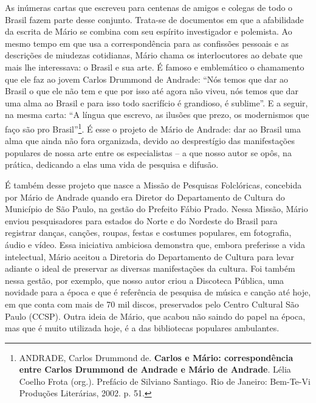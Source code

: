 \documentclass[11pt]{extarticle}
\begin{document}
As inúmeras cartas que escreveu para centenas de amigos e colegas de
todo o Brasil fazem parte desse conjunto. Trata-se de documentos em que
a afabilidade da escrita de Mário se combina com seu espírito
investigador e polemista. Ao mesmo tempo em que usa a correspondência
para as confissões pessoais e as descrições de miudezas cotidianas,
Mário chama os interlocutores ao debate que mais lhe interessava: o
Brasil e sua arte. É famoso e emblemático o chamamento que ele faz ao
jovem Carlos Drummond de Andrade: ``Nós temos que dar ao Brasil o que
ele não tem e que por isso até agora não viveu, nós temos que dar uma
alma ao Brasil e para isso todo sacrifício é grandioso, é sublime''. E a
seguir, na mesma carta: ``A língua que escrevo, as ilusões que prezo, os
modernismos que faço são pro Brasil''\footnote{ANDRADE, Carlos Drummond
  de. \textbf{Carlos e Mário: correspondência entre Carlos Drummond de
  Andrade e Mário de Andrade}. Lélia Coelho Frota (org.). Prefácio de
  Silviano Santiago. Rio de Janeiro: Bem-Te-Vi Produções Literárias,
  2002. p. 51.}. É esse o projeto de Mário de Andrade: dar ao Brasil uma
alma que ainda não fora organizada, devido ao desprestígio das
manifestações populares de nossa arte entre os especialistas -- a que
nosso autor se opôs, na prática, dedicando a elas uma vida de pesquisa e
difusão.

É também desse projeto que nasce a Missão de Pesquisas Folclóricas,
concebida por Mário de Andrade quando era Diretor do Departamento de
Cultura do Município de São Paulo, na gestão do Prefeito Fábio Prado.
Nessa Missão, Mário enviou pesquisadores para estados do Norte e do
Nordeste do Brasil para registrar danças, canções, roupas, festas e
costumes populares, em fotografia, áudio e vídeo. Essa iniciativa
ambiciosa demonstra que, embora preferisse a vida intelectual, Mário
aceitou a Diretoria do Departamento de Cultura para levar adiante o
ideal de preservar as diversas manifestações da cultura. Foi também
nessa gestão, por exemplo, que nosso autor criou a Discoteca Pública,
uma novidade para a época e que é referência de pesquisa de música e
canção até hoje, em que conta com mais de 70 mil discos, preservados
pelo Centro Cultural São Paulo (CCSP). Outra ideia de Mário, que acabou
não saindo do papel na época, mas que é muito utilizada hoje, é a das
bibliotecas populares ambulantes.
\end{document}

